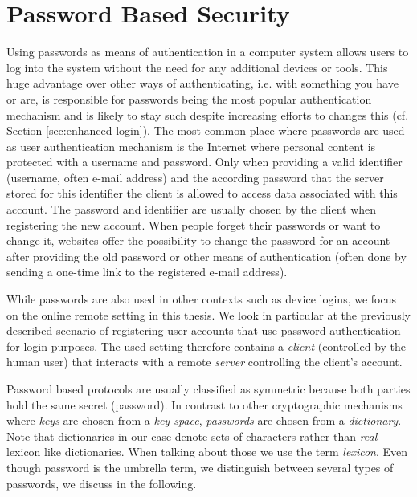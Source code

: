 
\section{Password Based Security}
Using passwords as means of authentication in a computer system allows users to log into the system without the need for any additional devices or tools.
This huge advantage over other ways of authenticating, i.e. with something you have or are, is responsible for passwords being the most popular authentication mechanism and is likely to stay such despite increasing efforts to changes this (cf. Section \ref{sec:enhanced-login}).
The most common place where passwords are used as user authentication mechanism is the Internet where personal content is protected with a username and password.
Only when providing a valid identifier (username, often e-mail address) and the according password that the server stored for this identifier the client is allowed to access data associated with this account.
The password and identifier are usually chosen by the client when registering the new account.
When people forget their passwords or want to change it, websites offer the possibility to change the password for an account after providing the old password or other means of authentication (often done by sending a one-time link to the registered e-mail address).

While passwords are also used in other contexts such as device logins, we focus on the online remote setting in this thesis.
We look in particular at the previously described scenario of registering user accounts that use password authentication for login purposes.
The used setting therefore contains a \emph{client} (controlled by the human user) that interacts with a remote \emph{server} controlling the client's account.

Password based protocols are usually classified as symmetric because both parties hold the same secret (password).
In contrast to other cryptographic mechanisms where \emph{keys} are chosen from a \emph{key space}, \emph{passwords} are chosen from a \emph{dictionary}.
Note that dictionaries in our case denote sets of characters rather than \emph{real} lexicon like dictionaries.
When talking about those we use the term \emph{lexicon}.
Even though password is the umbrella term, we distinguish between several types of passwords, we discuss in the following.

